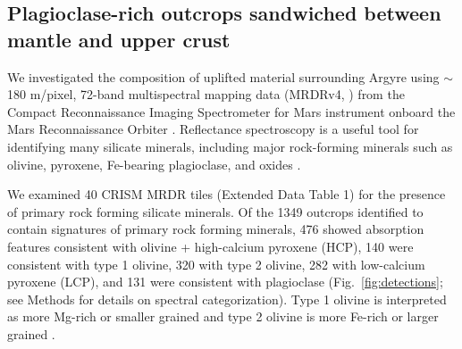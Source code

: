 \documentclass[12pt]{article}
\begin{document}
\subsection*{Plagioclase-rich outcrops sandwiched between mantle and upper crust}

We investigated the composition of uplifted material surrounding Argyre using $\sim$180 m/pixel, 72-band multispectral mapping data (MRDRv4, \citealt{Seelos2023}) from the Compact Reconnaissance Imaging Spectrometer for Mars \citep[CRISM,][]{Murchie2007} instrument onboard the Mars Reconnaissance Orbiter \citep{Zurek2007}. Reflectance spectroscopy is a useful tool for identifying many silicate minerals, including major rock-forming minerals such as olivine, pyroxene, Fe-bearing plagioclase, and oxides \citep{Adams1967, Adams1968, Clark1984, burns1993}.

We examined 40 CRISM MRDR tiles (Extended Data Table 1) for the presence of primary rock forming silicate minerals. Of the 1349 outcrops identified to contain signatures of primary rock forming minerals, 476 showed absorption features consistent with olivine + high-calcium pyroxene (HCP), 140 were consistent with type 1 olivine, 320 with type 2 olivine, 282 with low-calcium pyroxene (LCP), and 131 were consistent with plagioclase (Fig.~\ref{fig:detections}; see Methods for details on spectral categorization). Type 1 olivine is interpreted as more Mg-rich or smaller grained and type 2 olivine is more Fe-rich or larger grained \citep{Viviano2014,Ody2013}. 
\end{document}
